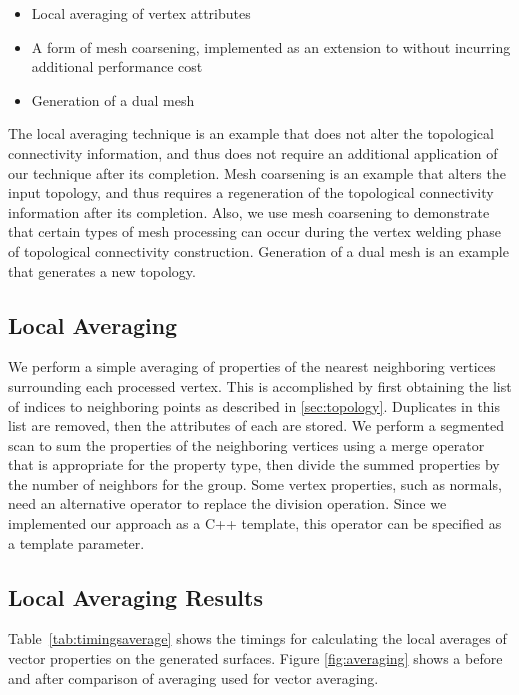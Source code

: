 \documentclass[review,journal]{vgtc}         %
\begin{document}
\begin{itemize}
\item{Local averaging of vertex attributes}
\item{A form of mesh coarsening, implemented as an extension to  without incurring additional performance cost}
\item{Generation of a dual mesh}
\end{itemize}

The local averaging technique is an example that does not alter the topological connectivity information, and thus does not require an additional application of our technique after its completion. Mesh coarsening is an example that alters the input topology, and thus requires a regeneration of the topological connectivity information after its completion. Also, we use mesh coarsening to demonstrate that certain types of mesh processing can occur during the vertex welding phase of topological connectivity construction. Generation of a dual mesh is an example that generates a new topology.

\subsection{Local Averaging}

We perform a simple averaging of properties of the nearest neighboring vertices surrounding each processed vertex. This is accomplished by first obtaining the list of indices to neighboring points as described in \ref{sec:topology}. Duplicates in this list are removed, then the attributes of each are stored. We perform a segmented scan \cite{Blelloch1991} to sum the properties of the neighboring vertices using a merge operator that is appropriate for the property type, then divide the summed properties by the number of neighbors for the group. Some vertex properties, such as normals, need an alternative operator to replace the division operation. Since we implemented our approach as a C++ template, this operator can be specified as a template parameter.

\subsection{Local Averaging Results}

Table~\ref{tab:timingsaverage} shows the timings for calculating the local averages of vector properties on the generated surfaces. Figure \ref{fig:averaging} shows a before and after comparison of averaging used for vector averaging.
\end{document}
